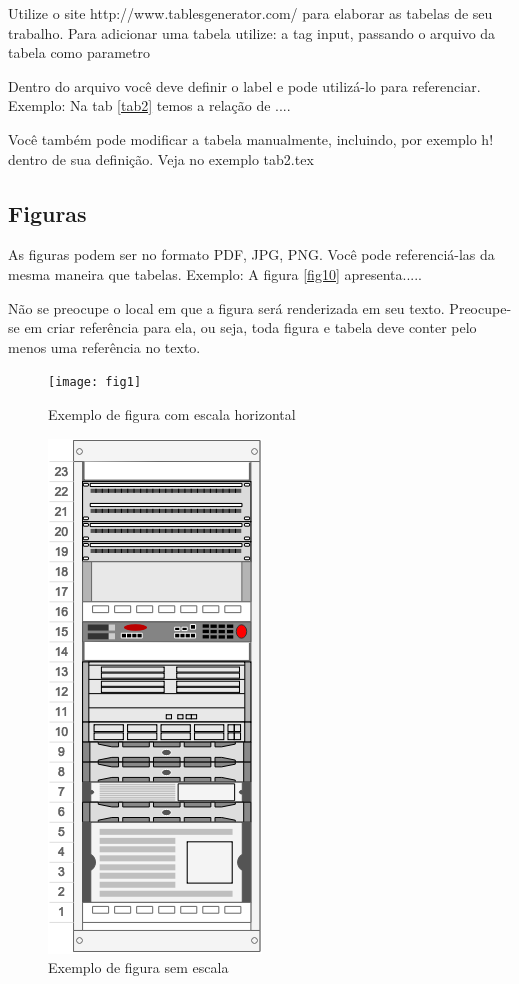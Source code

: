 \documentclass[	DIV=calc,%
							paper=a4,%
							fontsize=12pt,%
							onecolumn]{scrartcl}	 					%
\begin{document}
Utilize o site http://www.tablesgenerator.com/ para elaborar as tabelas de seu trabalho.
Para adicionar uma tabela utilize: a tag input, passando o arquivo da tabela como parametro



Dentro do arquivo você deve definir o label e pode utilizá-lo para referenciar. Exemplo:
Na tab \ref{tab2} temos a relação de ....


Você também pode modificar a tabela manualmente, incluindo, por exemplo h! dentro de sua definição. Veja no exemplo tab2.tex

\subsection{Figuras}

As figuras podem ser no formato PDF, JPG, PNG. Você pode referenciá-las da mesma maneira que tabelas. Exemplo: A figura \ref{fig10} apresenta.....

Não se preocupe o local em que a figura será renderizada em seu texto. Preocupe-se em criar referência para ela, ou seja, toda figura e tabela deve conter pelo menos uma referência no texto.

\begin{figure}
\centering
\texttt{[image: fig1]}
\caption{Exemplo de figura com escala horizontal}
\label{fig1}
\end{figure}


\begin{figure}
	\centering
	\includegraphics[]{fig2}
	\caption{Exemplo de figura sem escala}
	\label{fig2}
\end{figure}
\end{document}
